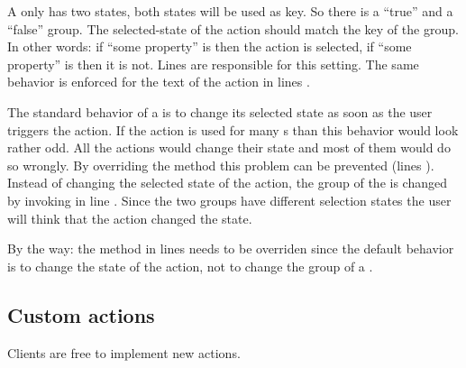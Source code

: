A  only has two states, both states will be used as key. So there is a ``true'' and a ``false'' group. The selected-state of the action should match the key of the group. In other words: if ``some property'' is  then the action is selected, if ``some property'' is  then it is not. Lines  are responsible for this setting. The same behavior is enforced for the text of the action in lines .

The standard behavior of a  is to change its selected state as soon as the user triggers the action. If the action is used for many s than this behavior would look rather odd. All the actions would change their state and most of them would do so wrongly. By overriding the method  this problem can be prevented (lines ). Instead of changing the selected state of the action, the group of the  is changed by invoking  in line . Since the two groups have different selection states the user will think that the action changed the state.

By the way: the method  in lines  needs to be overriden since the default behavior is to change the state of the action, not to change the group of a .




\subsection{Custom actions}
Clients are free to implement new actions.

